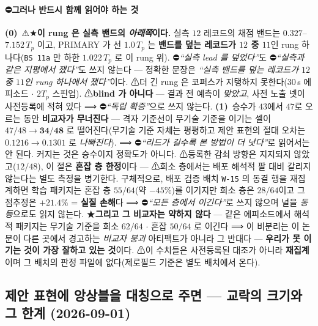 \documentclass[11pt]{report}
\numberwithin{equation}{chapter}
\numberwithin{figure}{chapter}
\numberwithin{table}{chapter}
\begin{document}
\paragraph{⛔그러나 반드시 함께 읽어야 하는 것}
\textbf{(0)}~⚠★\textbf{이 rung 은 실측 밴드의 \emph{아래쪽}이다.} 실측 $12$ 레코드의 채점
밴드는 $0.327$--$7.152\,T_p$ 이고, PRIMARY 가 선 $1.0\,T_p$ 는 \textbf{밴드를 덮는 레코드가
$12$ 중 $11$}인 rung 하나다(\texttt{BS\,11a} 만 하한 $1.022\,T_p$ 로 이 rung 위).
⛔\emph{``실측 lead 를 덮었다''}도 ⛔\emph{``실측과 같은 지평에서 쟀다''}도 쓰지 않는다 ---
정확한 문장은 \emph{``실측 밴드를 덮는 레코드가 $12$ 중 $11$인 rung 하나에서 쟀다''}이다.
⚠더 긴 rung 은 코퍼스가 지탱하지 못한다($30$\,s 에피소드 $\cdot$ $2T_p$ 스핀업).
⚠\textbf{blind 가 아니다} --- 결과 전 예측이 \emph{맞았고}, 사전 노출 넷이 사전등록에
적혀 있다 ⟹ ⛔\emph{``독립 확증''}으로 쓰지 않는다.
\textbf{(1)}~승수가 $43$에서 $47$로 오르는 동안 \textbf{비교자가 무너진다} --- 격자 기준선이 무기술
기준을 이기는 셀이 $47/48 \to \mathbf{34/48}$ 로 떨어진다(무기술 기준 자체는 평평하고
제안 표현의 절대 오차는 $0.1216 \to 0.1301$ 로 \emph{나빠진다}).
⟹ ⛔\emph{``리드가 길수록 본 방법이 더 낫다''}로 읽어서는 안 된다. 커지는 것은 승수이지
정확도가 아니다. ⚠등록한 감쇠 방향은 지지되지 않았고($12/48$), 이 절은 \textbf{혼잡 층
한정}이다 --- ⚠희소 층에서는 배포 해석적 팔 대비 갈리지 않는다는 별도 측정을 병기한다.
구체적으로, 배포 검증 배치 \texttt{W-15} 의 동결 행을 재집계하면 학습 패키지는
혼잡 층 $55/64$(약 $-45\%$)를 이기지만 희소 층은 $28/64$이고 그 점추정은
$+21.4\%$ = \textbf{실질 손해}다 ⟹ ⛔\emph{``모든 층에서 이긴다''}로 쓰지 않으며
널을 \emph{동등}으로도 읽지 않는다.
★\textbf{그리고 그 비교자는 약하지 않다} --- 같은 에피소드에서 해석적 패키지는
무기술 기준을 희소 $62/64$ $\cdot$ 혼잡 $50/64$ 로 이긴다 ⟹ 이 비분리는 이 논문이
다른 곳에서 경고하는 \emph{비교자 붕괴} 아티팩트가 아니라 그 반대다 ---
\textbf{우리가 못 이기는 것이 가장 잘하고 있는 것}이다.
⚠이 수치들은 사전등록된 대조가 아니라 \textbf{재집계}이며 그 배치의 판정 파일에
없다(제로필드 기준은 별도 배치에서 온다).

\subsection{제안 표현에 앙상블을 대칭으로 주면 --- 교락의 크기와 그 한계 (2026-09-01)}
\label{sec:ens_transfer}
\end{document}
